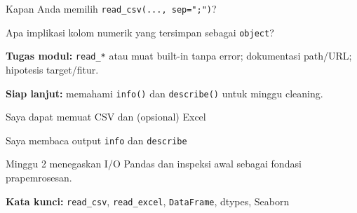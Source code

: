 \documentclass[../main.tex]{subfiles}
\begin{document}
\begin{latihan}
  \item Kapan Anda memilih \texttt{read\_csv(..., sep=";")}?
  \item Apa implikasi kolom numerik yang tersimpan sebagai \texttt{object}?
\end{latihan}

\begin{asesmen}
\textbf{Tugas modul:} \texttt{read\_*} atau muat built-in tanpa error; dokumentasi path/URL; hipotesis target/fitur.

\textbf{Siap lanjut:} memahami \texttt{info()} dan \texttt{describe()} untuk minggu cleaning.
\end{asesmen}

\begin{checklist}
  \item Saya dapat memuat CSV dan (opsional) Excel
  \item Saya membaca output \texttt{info} dan \texttt{describe}
\end{checklist}

\begin{rangkuman}
Minggu 2 menegaskan I/O Pandas dan inspeksi awal sebagai fondasi prapemrosesan.

\textbf{Kata kunci:} \texttt{read\_csv}, \texttt{read\_excel}, \texttt{DataFrame}, dtypes, Seaborn
\end{rangkuman}
\end{document}
